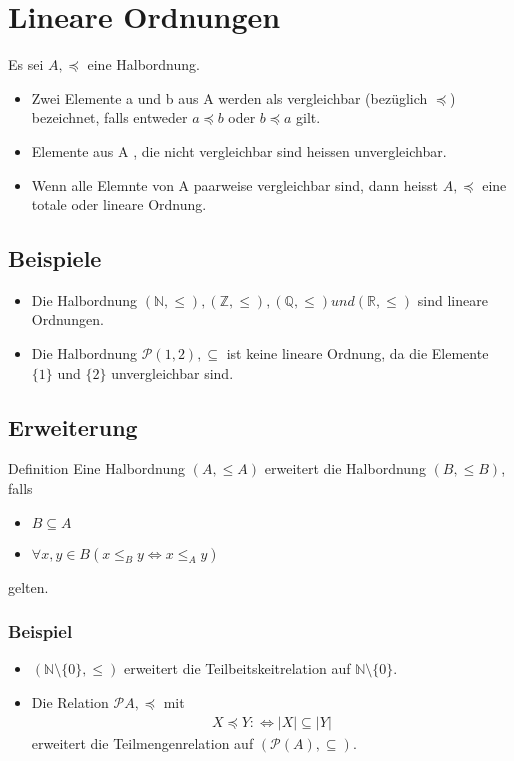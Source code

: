 \section{Lineare Ordnungen}
Es sei $A,\preceq$ eine Halbordnung.
\begin{itemize}
    \item Zwei Elemente a und b aus A werden als vergleichbar (bezüglich $\preceq$) bezeichnet, 
    falls entweder $a \preceq b$ oder $b \preceq a$ gilt.
    \item Elemente aus A , die nicht vergleichbar sind heissen unvergleichbar.
    \item Wenn alle Elemnte von A paarweise vergleichbar sind, dann heisst $A,\preceq$ eine totale oder lineare Ordnung.
\end{itemize}

\subsection{Beispiele}
\begin{itemize}
    \item Die Halbordnung $(\mathbb{N}, \leq), (\mathbb{Z}, \leq), (\mathbb{Q}, \leq) und (\mathbb{R}, \leq)$
    sind lineare Ordnungen.
    \item Die Halbordnung $\mathcal{P}({1,2}),\subseteq$ ist keine lineare Ordnung, da
    die Elemente $\{1\}$ und $\{2\}$ unvergleichbar sind.
\end{itemize}
\subsection{Erweiterung}
Definition
Eine Halbordnung $(A,\leq A)$ erweitert die Halbordnung $(B,\leq B )$, falls
\begin{itemize}
    \item $B \subseteq A$
    \item $\forall{x,y} \in B (x \leq_{B} y \Leftrightarrow x \leq_{A} y)$
\end{itemize}
gelten.
\subsubsection{Beispiel}
\begin{itemize}
    \item $(\mathbb{N} \setminus \{0\},\leq)$ erweitert die Teilbeitskeitrelation auf $\mathbb{N} \setminus \{0\}$.
    \item Die Relation $\mathcal{P}{A},\preceq$ mit
    \begin{align*}
        X \preceq Y: \Leftrightarrow |X| \subseteq |Y|
    \end{align*}
    erweitert die Teilmengenrelation auf $(\mathcal{P}(A),\subseteq)$.
\end{itemize}
